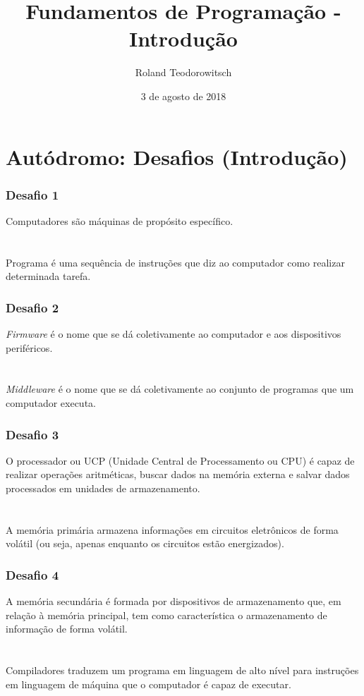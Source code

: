 \documentclass[aspectratio=169]{beamer}
\title[\sc{FPROG - Introdução}]{Fundamentos de Programa\c{c}\~ao - Introdução}
\author[Roland Teodorowitsch]{Roland Teodorowitsch}
\institute[CC - EP - PUCRS]{Curso de Ciência da Computação - Escola Politécnica - PUCRS}
\date{3 de agosto de 2018}
\begin{document}
\justifying

\begin{frame}
	\titlepage
\end{frame}

\section{Autódromo: Desafios (Introdução)}

\begin{frame}\frametitle{Desafio 1}
Computadores são máquinas de propósito específico.\\
~\\
~\\
Programa é uma sequência de instruções que diz ao computador como realizar determinada tarefa.
\end{frame}

\begin{frame}\frametitle{Desafio 2}
\emph{Firmware} é o nome que se dá coletivamente ao computador e aos dispositivos periféricos.\\
~\\
~\\
\emph{Middleware} é o nome que se dá coletivamente ao conjunto de programas que um computador executa.
\end{frame}

\begin{frame}\frametitle{Desafio 3}
O processador ou UCP (Unidade Central de Processamento ou CPU) é capaz de realizar operações aritméticas, buscar dados na memória externa e salvar dados processados em unidades de armazenamento.\\
~\\
~\\
A memória primária armazena informações em circuitos eletrônicos de forma volátil (ou seja, apenas enquanto os circuitos estão energizados).
\end{frame}

\begin{frame}\frametitle{Desafio 4}
A memória secundária é formada por dispositivos de armazenamento que, em relação à memória principal, tem como característica o armazenamento de informação de forma volátil.\\
~\\
~\\
Compiladores traduzem um programa em linguagem de alto nível para instruções em linguagem de máquina que o computador é capaz de executar.
\end{frame}
\end{document}
